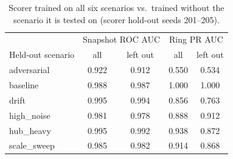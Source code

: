 \begin{table}[t]
\centering
\caption{Scorer trained on all six scenarios vs.\ trained without the scenario it is tested on
(scorer hold-out seeds 201--205).}
\label{tab:loso}
\small
\setlength{\tabcolsep}{3pt}
\begin{tabular}{lcccc}
\toprule
& \multicolumn{2}{c}{Snapshot ROC AUC} & \multicolumn{2}{c}{Ring PR AUC} \\
Held-out scenario & all & left out & all & left out \\
\midrule
adversarial & 0.922 & 0.912 & 0.550 & 0.534 \\
baseline & 0.988 & 0.987 & 1.000 & 1.000 \\
drift & 0.995 & 0.994 & 0.856 & 0.763 \\
high\_noise & 0.981 & 0.978 & 0.888 & 0.912 \\
hub\_heavy & 0.995 & 0.992 & 0.938 & 0.872 \\
scale\_sweep & 0.985 & 0.982 & 0.914 & 0.868 \\
\bottomrule
\end{tabular}
\end{table}
